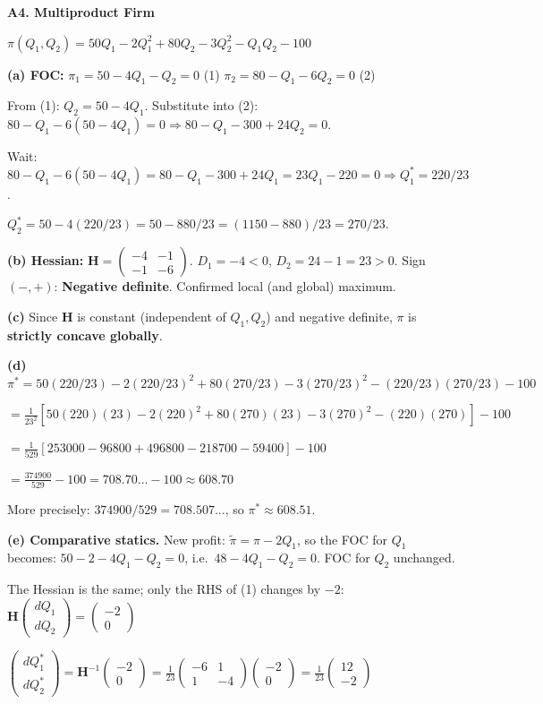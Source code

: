 \documentclass[12pt, a4paper]{article}
\theoremstyle{definition}
\newcommand{\bH}{\mathbf{H}}
\begin{document}
\begin{solbox}
\textbf{A4. Multiproduct Firm}

$\pi(Q_1,Q_2) = 50Q_1-2Q_1^2+80Q_2-3Q_2^2-Q_1Q_2-100$

\textbf{(a) FOC:}
$\pi_1 = 50-4Q_1-Q_2=0$ \quad (1)
$\pi_2 = 80-Q_1-6Q_2=0$ \quad (2)

From (1): $Q_2=50-4Q_1$. Substitute into (2):
$80-Q_1-6(50-4Q_1)=0 \Rightarrow 80-Q_1-300+24Q_2=0$.

Wait: $80-Q_1-6(50-4Q_1)=80-Q_1-300+24Q_1=23Q_1-220=0 \Rightarrow Q_1^*=220/23$.

$Q_2^* = 50-4(220/23) = 50-880/23 = (1150-880)/23 = 270/23$.

\textbf{(b) Hessian:}
$\bH=\begin{pmatrix}-4&-1\\-1&-6\end{pmatrix}$.
$D_1=-4<0$, $D_2=24-1=23>0$.
Sign $(-,+)$: \textbf{Negative definite}. Confirmed local (and global) maximum. \checkmark

\textbf{(c)} Since $\bH$ is constant (independent of $Q_1, Q_2$) and negative definite, $\pi$ is \textbf{strictly concave globally}.

\textbf{(d)} $\pi^* = 50(220/23)-2(220/23)^2+80(270/23)-3(270/23)^2-(220/23)(270/23)-100$

$= \frac{1}{23^2}[50(220)(23)-2(220)^2+80(270)(23)-3(270)^2-(220)(270)]-100$

$= \frac{1}{529}[253000-96800+496800-218700-59400]-100$

$= \frac{374900}{529}-100 = 708.70\ldots-100 \approx 608.70$

More precisely: $374900/529 = 708.507...$, so $\pi^* \approx 608.51$.

\textbf{(e) Comparative statics.}
New profit: $\tilde\pi = \pi - 2Q_1$, so the FOC for $Q_1$ becomes:
$50-2-4Q_1-Q_2=0$, i.e.\ $48-4Q_1-Q_2=0$.
FOC for $Q_2$ unchanged.

The Hessian is the same; only the RHS of (1) changes by $-2$:
$\bH\begin{pmatrix}dQ_1\\dQ_2\end{pmatrix} = \begin{pmatrix}-2\\0\end{pmatrix}$

$\begin{pmatrix}dQ_1^*\\dQ_2^*\end{pmatrix}
= \bH^{-1}\begin{pmatrix}-2\\0\end{pmatrix}
= \frac{1}{23}\begin{pmatrix}-6&1\\1&-4\end{pmatrix}\begin{pmatrix}-2\\0\end{pmatrix}
= \frac{1}{23}\begin{pmatrix}12\\-2\end{pmatrix}$


\end{solbox}
\end{document}
